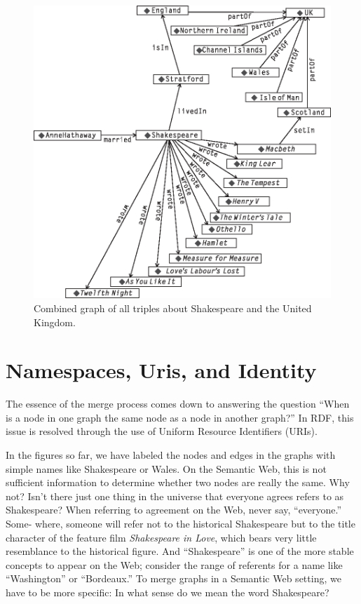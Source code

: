 \begin{figure}
    \centering
    \includegraphics[width=5.0in]{media/ch3/f03-06-9780123859655.eps}
    \caption{Combined graph of all triples about Shakespeare and the United Kingdom.}
    \label{fig:ch3.6}
\end{figure}



\section{Namespaces, Uris, and Identity}

The essence of the merge process comes down to answering the question ``When is
a node in one graph the same node as a node in another graph?'' In RDF,
this issue is resolved through the use of Uniform Resource Identifiers
(URIs).

In the figures so far, we have labeled the nodes and edges in the graphs
with simple names like Shakespeare or Wales. On the Semantic Web, this
is not sufficient information to determine whether two nodes are really
the same. Why not? Isn't there just one thing in the universe that
everyone agrees refers to as Shakespeare? When referring to agreement on
the Web, never say, ``everyone.'' Some- where, someone will refer not to
the historical Shakespeare but to the title character of the feature
film \emph{Shakespeare in Love}, which bears very little resemblance to
the historical figure. And ``Shakespeare'' is one of the more stable
concepts to appear on the Web; consider the range of referents for a
name like ``Washington'' or ``Bordeaux.'' To merge graphs in a Semantic
Web setting, we have to be more specific: In what sense do we mean the
word Shakespeare?

